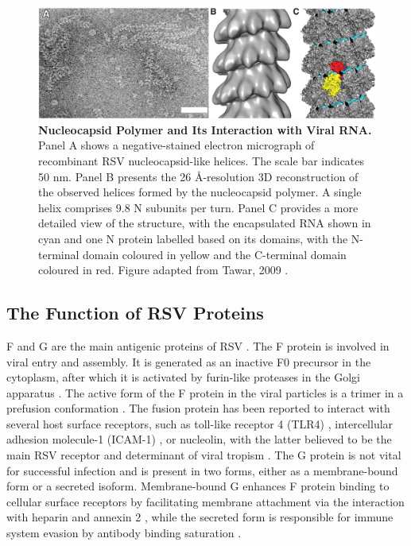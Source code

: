 \begin{figure}
    \centering
    \includegraphics[width=1\linewidth]{04. Introduction//Figs/08. N-structure.jpeg}
    \caption[Nucleocapsid Polymer and Its Interaction with Viral RNA.]{\textbf{Nucleocapsid Polymer and Its Interaction with Viral RNA.} Panel A shows a negative-stained electron micrograph of recombinant RSV nucleocapsid-like helices. The scale bar indicates 50 nm. Panel B presents the 26 \r{A}-resolution 3D reconstruction of the observed helices formed by the nucleocapsid polymer. A single helix comprises 9.8 N subunits per turn. Panel C provides a more detailed view of the structure, with the encapsulated RNA shown in cyan and one N protein labelled based on its domains, with the N-terminal domain coloured in yellow and the C-terminal domain coloured in red. Figure adapted from Tawar, 2009 \cite{Tawar2009CrystalVirus}.}
    \label{fig:Nucleocapsid Polymer and Its Interaction with Viral RNA}
\end{figure}

\subsection{The Function of RSV Proteins} \label{subsec:The Function of RSV Proteins}
F and G are the main antigenic proteins of RSV \cite{Collins2011ProgressYears, Battles2019RespiratoryIt}. The F protein is involved in viral entry and assembly. It is generated as an inactive F0 precursor in the cytoplasm, after which it is activated by furin-like proteases in the Golgi apparatus \cite{Collins1984NucleotideVirus.}. The active form of the F protein in the viral particles is a trimer in a prefusion conformation \cite{Ternette2007ImmunogenicityVirus}. The fusion protein has been reported to interact with several host surface receptors, such as toll-like receptor 4 (TLR4) \cite{Marr2012RoleReplication}, intercellular adhesion molecule-1 (ICAM-1) \cite{Behera2001BlockingInfection}, or nucleolin, with the latter believed to be the main RSV receptor and determinant of viral tropism \cite{Tayyari2011IdentificationVirus}. The G protein is not vital for successful infection and is present in two forms, either as a membrane-bound form or a secreted isoform. Membrane-bound G enhances F protein binding to cellular surface receptors by facilitating membrane attachment via the interaction with heparin and annexin 2 \cite{Collins2013RespiratoryDisease, Krusat1997Heparin-dependentCells, Malhotra2003IsolationCells}, while the secreted form is responsible for immune system evasion by antibody binding saturation \cite{Bukreyev2008TheLeukocytes}. 

